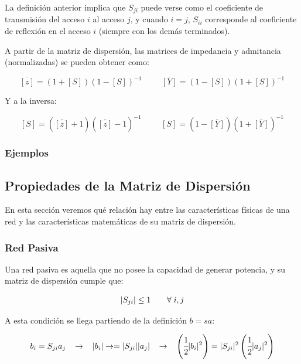 \documentclass[12pt]{article}
\begin{document}
\vspace{0.3cm}

La definici\'on anterior implica que $S_{ji}$ puede verse como el coeficiente de transmisi\'on del acceso $i$ al acceso $j$, y cuando $i = j$, $S_{ii}$ corresponde al coeficiente de reflexi\'on en el acceso $i$ (siempre con los dem\'as terminados).

\vspace{0.3cm}

A partir de la matriz de dispersi\'on, las matrices de impedancia y admitancia (normalizadas) se pueden obtener como:

$$\overline{[z]} = (1+[S])(1-[S])^{-1} \hspace{1cm} \overline{[Y]} = (1-[S])(1+[S])^{-1}$$

Y a la inversa:

$$[S] = (\overline{[z]} +1)(\overline{[z]} -1)^{-1} \hspace{1cm} [S] = (1-\overline{[Y]})(1+\overline{[Y]})^{-1}$$

\subsubsection{Ejemplos}

\subsection{Propiedades de la Matriz de Dispersi\'on}

En esta secci\'on veremos qu\'e relaci\'on hay entre las caracter\'isticas f\'isicas de una red y las caracter\'isticas matem\'aticas de su matriz de dispersi\'on.

\subsubsection{Red Pasiva}

Una red pasiva es aquella que no posee la capacidad de generar potencia, y su matriz de dispersi\'on cumple que:

$$|S_{ji}| \leq 1 \hspace{0.7cm} \forall\hspace{0.1cm} i, j$$

A esta condici\'on se llega partiendo de la definici\'on $b = sa$:

$$b_i = S_{ji} a_j \hspace{0.3cm} \rightarrow \hspace{0.3cm} |b_i|\rightarrow = |S_{ji}||a_j| \hspace{0.3cm} \rightarrow \hspace{0.3cm} \left(\cfrac{1}{2}|b_i|^2 \right)= |S_{ji}|^2 \left(\cfrac{1}{2}|a_j|^2\right)$$
\end{document}
